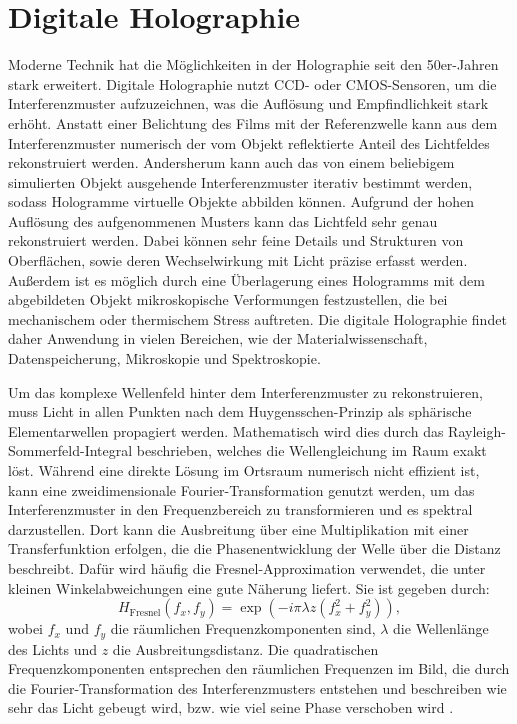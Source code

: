 \documentclass[10pt,twocolumn,a4paper]{article}
\begin{document}
\section{Digitale Holographie}
Moderne Technik hat die Möglichkeiten in der Holographie seit den 50er-Jahren stark erweitert. Digitale Holographie nutzt CCD- oder CMOS-Sensoren, um die Interferenzmuster aufzuzeichnen, was die Auflösung und Empfindlichkeit stark erhöht. Anstatt einer Belichtung des Films mit der Referenzwelle kann aus dem Interferenzmuster numerisch der vom Objekt reflektierte Anteil des Lichtfeldes rekonstruiert werden. Andersherum kann auch das von einem beliebigem simulierten Objekt ausgehende Interferenzmuster iterativ bestimmt werden, sodass Hologramme virtuelle Objekte abbilden können. Aufgrund der hohen Auflösung des aufgenommenen Musters kann das Lichtfeld sehr genau rekonstruiert werden. Dabei können sehr feine Details und Strukturen von Oberflächen, sowie deren Wechselwirkung mit Licht präzise erfasst werden. Außerdem ist es möglich durch eine Überlagerung eines Hologramms mit dem abgebildeten Objekt mikroskopische Verformungen festzustellen, die bei mechanischem oder thermischem Stress auftreten. Die digitale Holographie findet daher Anwendung in vielen Bereichen, wie der Materialwissenschaft, Datenspeicherung, Mikroskopie und Spektroskopie.

Um das komplexe Wellenfeld hinter dem Interferenzmuster zu rekonstruieren, muss Licht in allen Punkten nach dem Huygensschen-Prinzip als sphärische Elementarwellen propagiert werden. Mathematisch wird dies durch das Rayleigh-Sommerfeld-Integral beschrieben, welches die Wellengleichung im Raum exakt löst. Während eine direkte Lösung im Ortsraum numerisch nicht effizient ist, kann eine zweidimensionale Fourier-Transformation genutzt werden, um das Interferenzmuster in den Frequenzbereich zu transformieren und es spektral darzustellen. Dort kann die Ausbreitung über eine Multiplikation mit einer Transferfunktion erfolgen, die die Phasenentwicklung der Welle über die Distanz beschreibt. Dafür wird häufig die Fresnel-Approximation verwendet, die unter kleinen Winkelabweichungen eine gute Näherung liefert. Sie ist gegeben durch:
\begin{equation}
    H_{\text{Fresnel}}(f_x, f_y) = \exp\left(-i \pi \lambda z \left( f_x^2 + f_y^2 \right)\right),
    \label{eq:fesnel}
\end{equation}
wobei $f_x$ und $f_y$ die räumlichen Frequenzkomponenten sind, $\lambda$ die Wellenlänge des Lichts und $z$ die Ausbreitungsdistanz. Die quadratischen Frequenzkomponenten entsprechen den räumlichen Frequenzen im Bild, die durch die Fourier-Transformation des Interferenzmusters entstehen und beschreiben wie sehr das Licht gebeugt wird, bzw. wie viel seine Phase verschoben wird \cite{DH}. 
\end{document}
